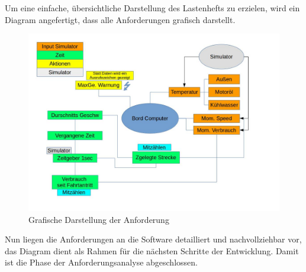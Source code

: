 \documentclass[a4paper,12pt]{article}
\begin{document}
Um eine einfache, übersichtliche Darstellung des Lastenhefts zu erzielen, wird ein Diagram angefertigt, dass alle Anforderungen grafisch darstellt.

\begin{figure}[!ht]

\begin{center}
\includegraphics[scale=0.60]{Requirements_v2.jpg}
\caption{Grafische Darstellung der Anforderung}
\end{center}

\end{figure}

Nun liegen die Anforderungen an die Software detailliert und nachvollziehbar vor, das Diagram dient als Rahmen für die nächsten Schritte der Entwicklung. Damit ist die Phase der Anforderungsanalyse abgeschlossen.
\end{document}
